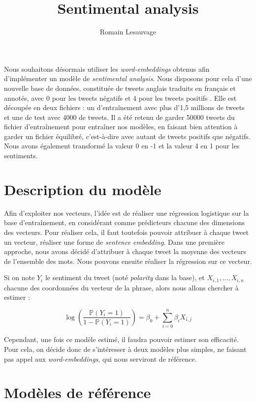 \documentclass[11pt,french,french]{article}
\title{Sentimental analysis}
\author{Romain Lesauvage}
\date{}
\begin{document}
\maketitle


Nous souhaitons désormais utiliser les \emph{word-embeddings} obtenus
afin d'implémenter un modèle de \emph{sentimental analysis}. Nous
disposons pour cela d'une nouvelle base de données, constituée de tweets
anglais traduits en français et annotés, avec 0 pour les tweets
\og négatifs \fg et 4 pour les tweets \og positifs \fg. Elle est
découpée en deux fichiers : un d'entraînement avec plus d'1,5 millions
de tweets et une de test avec 4000 de tweets. Il a été retenu de garder
50000 tweets du fichier d'entraînement pour entraîner nos modèles, en
faisant bien attention à garder un fichier équilibré, c'est-à-dire avec
autant de tweets positifs que négatifs. Nous avons également transformé
la valeur 0 en -1 et la valeur 4 en 1 pour les sentiments.

\section{Description du modèle}\label{description-du-moduxe8le}

Afin d'exploiter nos vecteurs, l'idée est de réaliser une régression
logistique sur la base d'entraînement, en considérant comme prédicteurs
chacune des dimensions des vecteurs. Pour réaliser cela, il faut
toutefois pouvoir attribuer à chaque tweet un vecteur, réaliser une
forme de \emph{sentence embedding}. Dans une première approche, nous
avons décidé d'attribuer à chaque tweet la moyenne des vecteurs de
l'ensemble des mots. Nous pouvons ensuite réaliser la régression sur ce
vecteur.

Si on note \(Y_i\) le sentiment du tweet (noté \emph{polarity} dans la
base), et \(X_{i,1}, \dots, X_{i,n}\) chacune des coordonnées du vecteur
de la phrase, alors nous allons chercher à estimer :

\begin{equation}
\log\left(\frac{\mathbb{P}(Y_i = 1)}{1 - \mathbb{P}(Y_i = 1)}\right) = \beta_0 + \sum\limits_{i = 0}^n \beta_i X_{i,j}
\end{equation}

Cependant, une fois ce modèle estimé, il faudra pouvoir estimer son
efficacité. Pour cela, on décide donc de s'intéresser à deux modèles
plus simples, ne faisant pas appel aux \emph{word-embeddings}, qui nous
serviront de référence.

\section{Modèles de référence}\label{moduxe8les-de-ruxe9fuxe9rence}
\end{document}
